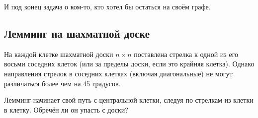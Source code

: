 \medskip

И под конец задача о ком-то, кто хотел бы остаться на своём графе.

\subsection*{Лемминг на шахматной доске}

На каждой клетке шахматной доски $n\times n$ поставлена стрелка к одной из его восьми соседних клеток (или за пределы доски, если это крайняя клетка).
Однако направления стрелок в соседних клетках (включая диагональные) не могут различаться более чем на 45 градусов.

Лемминг начинает свой путь с центральной клетки, следуя по стрелкам из клетки в клетку.
Обречён ли он упасть с доски?
